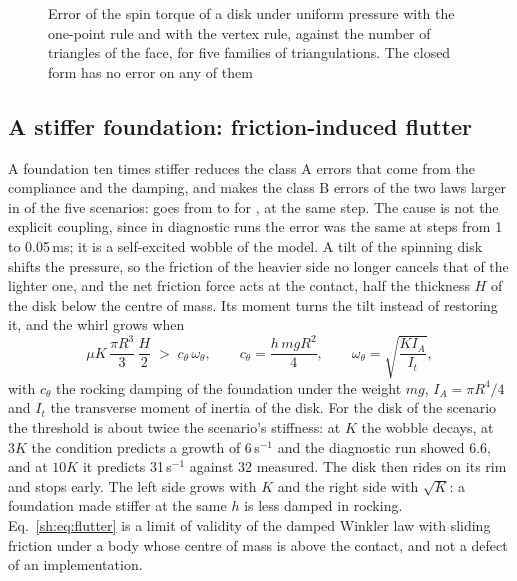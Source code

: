 \begin{figure}[t]
\centering
{}
\caption{Error of the spin torque of a disk under uniform pressure with the one-point rule and
with the vertex rule, against the number of triangles of the face, for five families of
triangulations. The closed form has no error on any of them}
\label{sh:fig:triangulation}
\end{figure}

\subsection{A stiffer foundation: friction-induced flutter}\label{sh:flutter}

A foundation ten times stiffer reduces the class A errors that come from the compliance and
the damping, and makes the class B errors of the two laws larger in  of
the five scenarios:  goes from
 to  for
, at the same step. The cause is not the explicit coupling, since in
diagnostic runs the error was the same at steps from 1 to 0.05\,ms; it is a self-excited
wobble of the model. A tilt of the spinning disk shifts the pressure, so the friction of the
heavier side no longer cancels that of the lighter one, and the net friction force acts at the
contact, half the thickness $H$ of the disk below the centre of mass. Its moment turns the
tilt instead of restoring it, and the whirl grows when
\begin{equation}
  \mu K\,\frac{\pi R^3}{3}\,\frac{H}{2} \;>\; c_\theta\,\omega_\theta ,
  \qquad c_\theta = \frac{h\,m g R^2}{4}, \qquad \omega_\theta = \sqrt{\frac{K I_A}{I_t}} ,
  \label{sh:eq:flutter}
\end{equation}
with $c_\theta$ the rocking damping of the foundation under the weight $m g$,
$I_A = \pi R^4/4$ and $I_t$ the transverse moment of inertia of the disk. For the disk of the scenario the threshold is about twice the scenario's stiffness:
at $K$ the wobble decays, at $3K$ the condition predicts a growth of 6\,s$^{-1}$ and the
diagnostic run showed 6.6, and at $10K$ it predicts 31\,s$^{-1}$ against 32 measured. The disk
then rides on its rim and stops early.
The left side grows with $K$ and the right side with $\sqrt K$: a foundation made stiffer at
the same $h$ is less damped in rocking. Eq.~\eqref{sh:eq:flutter} is a limit of validity of
the damped Winkler law with sliding friction under a body whose centre of mass is above the
contact, and not a defect of an implementation.


